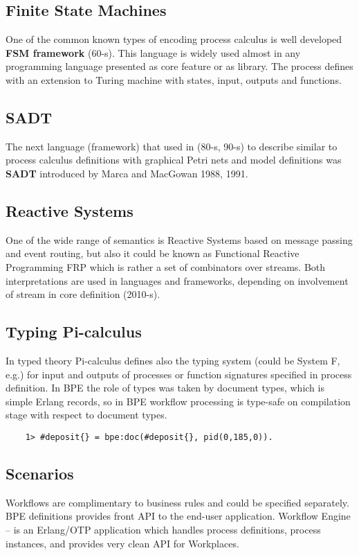 \subsection{Finite State Machines}
One of the common known types of encoding process calculus is well developed {\bf FSM framework} (60-s).
This language is widely used almost in any programming language presented as core
feature or as library. The process defines with an extension to Turing machine
with states, input, outputs and functions.

\subsection{SADT}
The next language (framework) that used in (80-s, 90-s) to describe similar
to process calculus definitions with graphical Petri nets and model definitions
was {\bf SADT} introduced by Marca and MacGowan 1988, 1991.

\subsection{Reactive Systems}
One of the wide range of semantics is Reactive Systems based on message passing
and event routing, but also it could be known as Functional Reactive Programming FRP
which is rather a set of combinators over streams. Both interpretations are
used in languages and frameworks, depending on involvement of stream in core
definition (2010-s).

\subsection{Typing Pi-calculus}
In typed theory Pi-calculus defines also the typing system (could be System F, e.g.) for
input and outputs of processes or function signatures specified in process definition.
In BPE the role of types was taken by document types, which is simple Erlang records,
so in BPE workflow processing is type-safe on compilation stage with respect to document types.

\vspace{1\baselineskip}
\begin{lstlisting}
    1> #deposit{} = bpe:doc(#deposit{}, pid(0,185,0)).
\end{lstlisting}

\newpage
\subsection{Scenarios}
Workflows are complimentary to business rules and could be specified separately.
BPE definitions provides front API to the end-user application.
Workflow Engine -- is an Erlang/OTP application which handles process definitions,
process instances, and provides very clean API for Workplaces.

